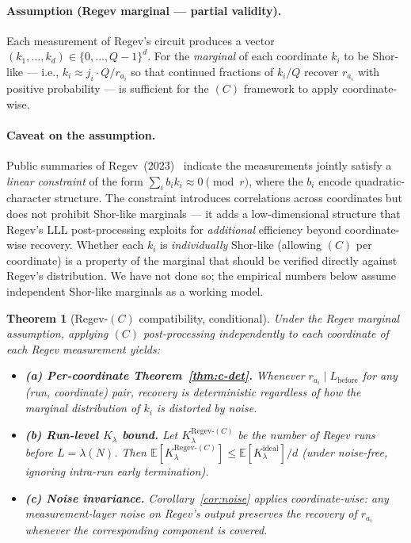 \documentclass[11pt]{article}
\newtheorem{theorem}{Theorem}
\begin{document}
\paragraph{Assumption (Regev marginal --- partial validity).} Each measurement of Regev's circuit produces a vector $(k_1, \ldots, k_d) \in \{0, \ldots, Q-1\}^d$. For the \emph{marginal} of each coordinate $k_i$ to be Shor-like --- i.e., $k_i \approx j_i \cdot Q / r_{a_i}$ so that continued fractions of $k_i / Q$ recover $r_{a_i}$ with positive probability --- is sufficient for the $(C)$ framework to apply coordinate-wise.

\paragraph{Caveat on the assumption.} Public summaries of Regev~(2023)~\cite{regev2023} indicate the measurements jointly satisfy a \emph{linear constraint} of the form $\sum_i b_i k_i \approx 0 \pmod{r}$, where the $b_i$ encode quadratic-character structure. The constraint introduces correlations across coordinates but does not prohibit Shor-like marginals --- it adds a low-dimensional structure that Regev's LLL post-processing exploits for \emph{additional} efficiency beyond coordinate-wise recovery. Whether each $k_i$ is \emph{individually} Shor-like (allowing $(C)$ per coordinate) is a property of the marginal that should be verified directly against Regev's distribution. We have not done so; the empirical numbers below assume independent Shor-like marginals as a working model.

\begin{theorem}[Regev-$(C)$ compatibility, conditional]\label{thm:regev-c}
Under the Regev marginal assumption, applying $(C)$ post-processing independently to each coordinate of each Regev measurement yields:
\begin{itemize}
  \item \textbf{(a) Per-coordinate Theorem~\ref{thm:c-det}.} Whenever $r_{a_i} \mid L_{\text{before}}$ for any (run, coordinate) pair, recovery is deterministic regardless of how the marginal distribution of $k_i$ is distorted by noise.
  \item \textbf{(b) Run-level $K_\lambda$ bound.} Let $K_\lambda^{\text{Regev-}(C)}$ be the number of Regev runs before $L = \lambda(N)$. Then $\mathbb{E}[K_\lambda^{\text{Regev-}(C)}] \leq \mathbb{E}[K_\lambda^{\text{ideal}}] / d$ (under noise-free, ignoring intra-run early termination).
  \item \textbf{(c) Noise invariance.} Corollary~\ref{cor:noise} applies coordinate-wise: any measurement-layer noise on Regev's output preserves the recovery of $r_{a_i}$ whenever the corresponding component is covered.
\end{itemize}
\end{theorem}
\end{document}
